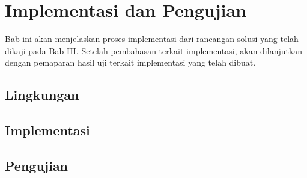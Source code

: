 \chapter{Implementasi dan Pengujian}
Bab ini akan menjelaskan proses implementasi dari rancangan solusi yang telah dikaji pada Bab III. Setelah pembahasan terkait implementasi, akan dilanjutkan dengan pemaparan hasil uji terkait implementasi yang telah dibuat.

\section{Lingkungan}
\blindtext

\section{Implementasi}
\blindtext




\section{Pengujian}
\blindtext

